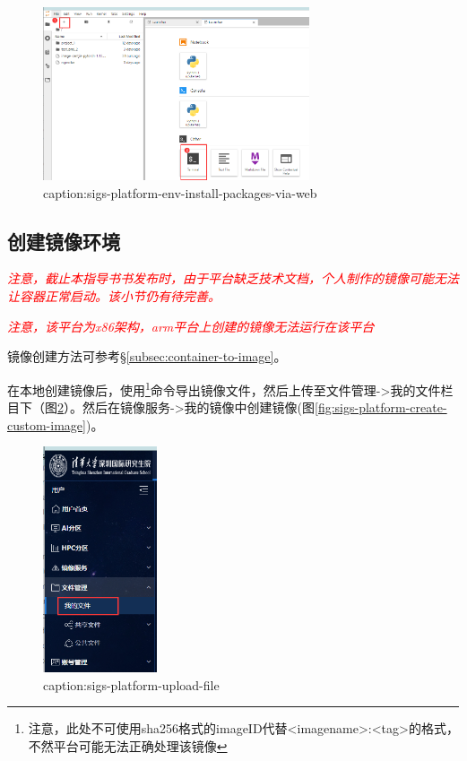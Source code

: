 \begin{figure}[htbp]
	\centering
	\includegraphics[width=0.7\textwidth]{figures/sigs-platform-env-install-packages-via-web.png}
	\caption{caption:sigs-platform-env-install-packages-via-web}
	\label{fig:sigs-platform-env-install-packages-via-web}
\end{figure}


\subsection{创建镜像环境}

\textcolor{red}{\emph{注意，截止本指导书书发布时，由于平台缺乏技术文档，个人制作的镜像可能无法让容器正常启动。该小节仍有待完善。}}

\textcolor{red}{\emph{注意，该平台为x86架构，arm平台上创建的镜像无法运行在该平台}}

镜像创建方法可参考\S\ref{subsec:container-to-image}。


在本地创建镜像后，使用\footnote{注意，此处不可使用sha256格式的imageID代替<imagename>:<tag>的格式，不然平台可能无法正确处理该镜像}命令导出镜像文件，然后上传至文件管理->我的文件栏目下（图\ref{fig:sigs-platform-upload-file}）。然后在镜像服务->我的镜像中创建镜像(图\ref{fig:sigs-platform-create-custom-image})。

\begin{figure}[htbp]
	\centering
	\includegraphics[width=0.3\textwidth]{figures/sigs-platform-upload-file.png}
	\caption{caption:sigs-platform-upload-file}
	\label{fig:sigs-platform-upload-file}
\end{figure}


